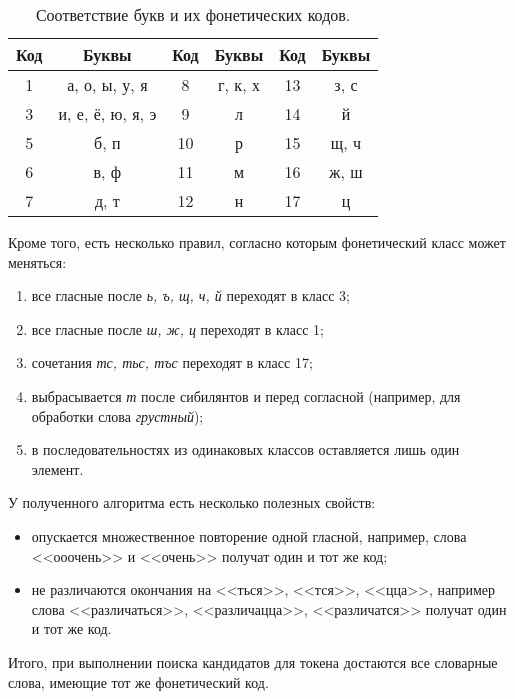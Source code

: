 \begin{table}[h]
	\begin{center}
		\caption{Соответствие букв и их фонетических кодов.}
		\label{table:phonetic_codes}
		\begin{tabular}{|c|c|c|c|c|c|}
			\hline
			\textbf{Код} & \textbf{Буквы} & \textbf{Код} & \textbf{Буквы} & \textbf{Код} & \textbf{Буквы}  \\
			\hline
			1 & а, о, ы, у, я & 8 & г, к, х  & 13 & з, с  \\
			3 & и, е, ё, ю, я, э  & 9 & л  & 14 & й  \\
			5 & б, п  & 10 & р  & 15 & щ, ч  \\
			6 & в, ф  & 11 & м  & 16 & ж, ш  \\
			7 & д, т  & 12 & н & 17 & ц  \\		
			\hline
		\end{tabular}
	\end{center}
\end{table}

Кроме того, есть несколько правил, согласно которым фонетический класс может меняться:
\begin{enumerate}
	\item все гласные после \textit{ь, ъ, щ, ч, й} переходят в класс 3;
	\item все гласные после \textit{ш, ж, ц} переходят в класс 1;
	\item сочетания \textit{тс, тьс, тъс} переходят в класс 17;
	\item выбрасывается \textit{т} после сибилянтов и перед согласной (например, для обработки слова \textit{грустный});
	\item в последовательностях из одинаковых классов оставляется лишь один элемент.
\end{enumerate}

У полученного алгоритма есть несколько полезных свойств:
\begin{itemize}
	\item опускается множественное повторение одной гласной, например, слова <<ооочень>> и <<очень>> получат один и тот же код;
	\item не различаются окончания на <<ться>>, <<тся>>, <<цца>>, например слова <<различаться>>, <<различацца>>, <<различатся>> получат один и тот же код.
\end{itemize}

Итого, при выполнении поиска кандидатов для токена достаются все словарные слова, имеющие тот же фонетический код.

